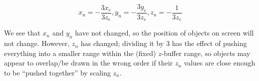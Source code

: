 \documentclass[11pt]{tingpset}
\begin{document}
    \[
      x_n = -\frac{3x_e}{3z_e}, y_n = -\frac{3y_e}{3z_e}, z_n = -\frac{1}{3z_e}
    \]

    We see that $x_n$ and $y_n$ have not changed, so the position of objects on screen will not change. However, $z_n$ has changed; dividing it by 3 has the effect of pushing everything into a smaller range within the (fixed) $z$-buffer range, so objects may appear to overlap/be drawn in the wrong order if their $z_n$ values are close enough to be ``pushed together'' by scaling $z_n$.



\end{document}
